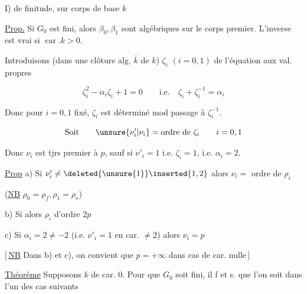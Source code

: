 I)  de finitude, sur corps de base $k$

\uline{Prop.} Si $G_0$ est fini, alors  $\beta_0,\beta_1$ sont algébriques sur le corps premier. L'inverse est vrai si  $\operatorname{car}.k>0$.



Introduisons  (dans une clôture alg. $\bar k$ de $k$) $\zeta_i$ $(i=0,1)$ de l'équation aux val. propres

\[
 \zeta_i^2-\alpha_i\zeta_i+1=0\qquad\text{i.e.}\quad \zeta_i+\zeta_i^{-1}=\alpha_i
\]

Donc pour $i=0,1$ fixé, $\zeta_i$ est déterminé mod passage à $\zeta_i^{-1}$.

\[
 \text{Soit}\qquad\unsure{\nu'_i|\nu_i}=\text{ordre de }\zeta_i\qquad i=0,1
\]

Donc $\nu_i$ est tjrs premier à $p$, sauf si $\nu'_i=1$ i.e. $\zeta_i=1$, i.e. $\alpha_i=2$.


\uline{Prop} a) Si $\nu'_i\ne\deleted{\unsure{1}}\inserted{1,2}$   alors $\nu_i=$ ordre de $\rho_i$

(\uline{NB} $\rho_0=\rho_f,\rho_1=\rho_s$)

b) Si  alors $\rho_i$ d'ordre $2p$

c) 
Si $\alpha_i=2\ne-2$ (i.e. $\nu'_i=1$ en car. $\ne2$) alors $\nu_i=p$

[\,\uline{NB} Dans b) et c), on convient que $p=+\infty$ dans cas de car. nulle\,]

\uline{Théorème} Supposons $k$ de car. $0$. Pour que $G_0$ soit fini, il f et s. que l'on soit dans l'un des  cas suivants


